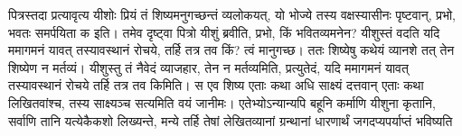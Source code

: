 \vakya पित्रस्तदा प्रत्यावृत्य यीशोः प्रियं तं शिष्यमनुगच्छन्तं व्यलोकयत्, यो भोज्ये तस्य वक्षस्यासीनः पृष्टवान्, प्रभो, भवतः समर्पयिता क इति।
\vakya तमेव दृष्ट्वा पित्रो यीशुं ब्रवीति, प्रभो, किं भवितव्यमनेन?
\vakya यीशुस्तं वदति यदि ममागमनं यावत् तस्यावस्थानं रोचये, तर्हि तत्र तव किं? त्वं मानुगच्छ।
\vakya ततः शिष्येषु कथेयं व्यानशे तत् तेन शिष्येण न मर्तव्यं। यीशुस्तु तं नैवेदं व्याजहार, तेन न मर्तव्यमिति, प्रत्युतेदं, यदि ममागमनं यावत् तस्यावस्थानं रोचये तर्हि तत्र तव किमिति।
\vakya स एव शिष्य एताः कथा अधि साक्ष्यं दत्तवान् एताः कथा लिखितवांश्च, तस्य साक्ष्यञ्च सत्यमिति वयं जानीमः।
\vakya एतेभ्योऽन्यान्यपि बहूनि कर्माणि यीशुना कृतानि, सर्वाणि तानि यत्येकैकशो लिख्यन्ते, मन्ये तर्हि तेषां लेखितव्यानां ग्रन्थानां धारणार्थं जगदप्यपर्याप्तं भविष्यति\eoc